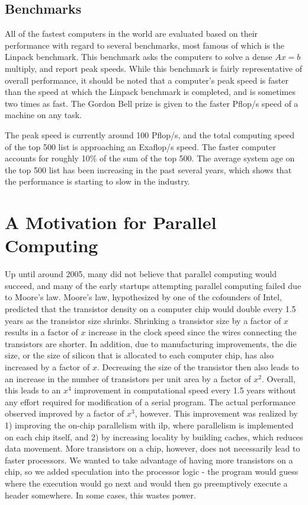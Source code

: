 \documentclass[10pt]{article}
\begin{document}
\begin{flushleft}
\subsection{Benchmarks}

All of the fastest computers in the world are evaluated based on their performance with regard to several benchmarks, most famous of which is the Linpack benchmark. This benchmark asks the computers to solve a dense \(Ax=b\) multiply, and report peak speeds. While this benchmark is fairly representative of overall performance, it should be noted that a computer's peak speed is faster than the speed at which the Linpack benchmark is completed, and is sometimes two times as fast. The Gordon Bell prize is given to the faster Pflop/s speed of a machine on any task.

The peak speed is currently around 100 Pflop/s, and the total computing speed of the top 500 list is approaching an Exaflop/s speed. The faster computer accounts for roughly 10\% of the sum of the top 500. The average system age on the top 500 list has been increasing in the past several years, which shows that the performance is starting to slow in the industry.

\section{A Motivation for Parallel Computing}

Up until around 2005, many did not believe that parallel computing would succeed, and many of the early startups attempting parallel computing failed due to Moore's law. Moore's law, hypothesized by one of the cofounders of Intel, predicted that the transistor density on a computer chip would double every 1.5 years as the transistor size shrinks. Shrinking a transistor size by a factor of \(x\) results in a factor of \(x\) increase in the clock speed since the wires connecting the transistors are shorter. In addition, due to manufacturing improvements, the die size, or the size of silicon that is allocated to each computer chip, has also increased by a factor of \(x\). Decreasing the size of the transistor then also leads to an increase in the number of transistors per unit area by a factor of \(x^2\). Overall, this leads to an \(x^4\) improvement in computational speed every 1.5 years without any effort required for modification of a serial program. The actual performance observed improved by a factor of \(x^3\), however. This improvement was realized by 1) improving the on-chip parallelism with \gls{ilp}, where parallelism is implemented on each chip itself, and 2) by increasing locality by building caches, which reduces data movement. More transistors on a chip, however, does not necessarily lead to faster processors. We wanted to take advantage of having more transistors on a chip, so we added speculation into the processor logic - the program would guess where the execution would go next and would then go preemptively execute a header somewhere. In some cases, this wastes power.


\end{flushleft}
\end{document}
